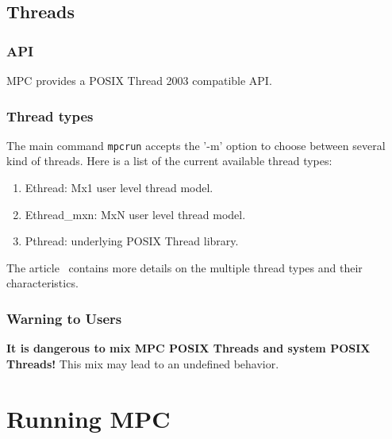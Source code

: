 \documentclass[a4paper,11pt]{article}
\begin{document}
\subsection{Threads}

\subsubsection{API}
MPC provides a POSIX Thread 2003 compatible API.

\subsubsection{Thread types}
The main command \texttt{mpcrun} accepts the '-m' option to choose between several kind of threads.
Here is a list of the current available thread types:

\begin{enumerate}
  \item  Ethread: Mx1 user level thread model.

  \item   Ethread\_mxn: MxN user level thread model.

  \item   Pthread: underlying POSIX Thread library.

\end{enumerate}
The article~\cite{Perache08} contains more details on the multiple thread types and their characteristics.


\subsubsection{Warning to Users}
\textbf{It is dangerous to mix MPC POSIX Threads and system POSIX Threads!}
This mix may lead to an undefined behavior.

\section{Running MPC}
\end{document}
